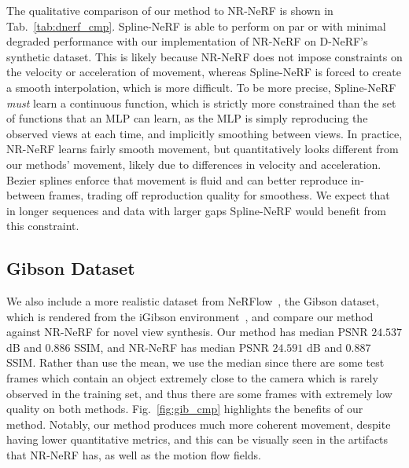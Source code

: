 The qualitative comparison of our method to NR-NeRF is shown in Tab.~\ref{tab:dnerf_cmp}. Spline-NeRF is able to perform on par or with minimal degraded performance with our implementation of NR-NeRF on D-NeRF's synthetic dataset. This is likely because NR-NeRF does not impose constraints on the velocity or acceleration of movement, whereas Spline-NeRF is forced to create a smooth interpolation, which is more difficult. To be more precise, Spline-NeRF \textit{must} learn a continuous function, which is strictly more constrained than the set of functions that an MLP can learn, as the MLP is simply reproducing the observed views at each time, and implicitly smoothing between views. In practice, NR-NeRF learns fairly smooth movement, but quantitatively looks different from our methods' movement, likely due to differences in velocity and acceleration. Bezier splines enforce that movement is fluid and can better reproduce in-between frames, trading off reproduction quality for smoothess. We expect that in longer sequences and data with larger gaps Spline-NeRF would benefit from this constraint.

\subsection*{Gibson Dataset}

We also include a more realistic dataset from NeRFlow~\cite{du2021nerflow}, the Gibson dataset, which is rendered from the iGibson environment~\cite{xu2019DISN}, and compare our method against NR-NeRF for novel view synthesis. Our method has median PSNR $24.537$ dB and $0.886$ SSIM, and NR-NeRF has median PSNR $24.591$ dB and $0.887$ SSIM. Rather than use the mean, we use the median since there are some test frames which contain an object extremely close to the camera which is rarely observed in the training set, and thus there are some frames with extremely low quality on both methods. Fig.~\ref{fig:gib_cmp} highlights the benefits of our method. Notably, our method produces much more coherent movement, despite having lower quantitative metrics, and this can be visually seen in the artifacts that NR-NeRF has, as well as the motion flow fields.

